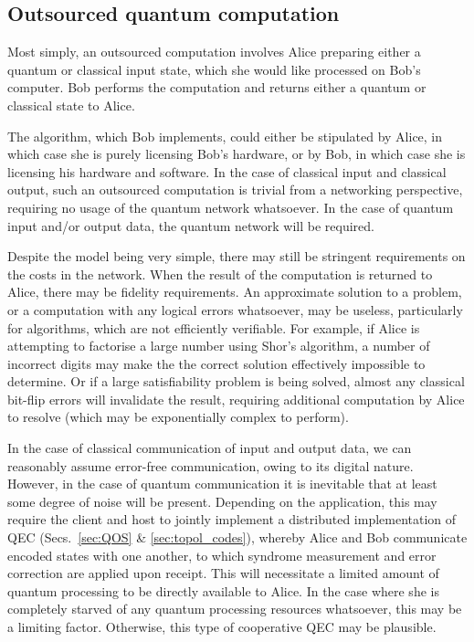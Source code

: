 \documentclass[aps,rmp,twocolumn,amsmath,amssymb,nofootinbib,superscriptaddress,longbibliography,floatfix,table-of-contents,eqsecnum]{revtex4-1}
\begin{document}
%
%

\subsection{Outsourced quantum computation} 

Most simply, an outsourced computation involves Alice preparing either a quantum or classical input state, which she would like processed on Bob's computer. Bob performs the computation and returns either a quantum or classical state to Alice.

The algorithm, which Bob implements, could either be stipulated by Alice, in which case she is purely licensing Bob's hardware, or by Bob, in which case she is licensing his hardware and software. In the case of classical input and classical output, such an outsourced computation is trivial from a networking perspective, requiring no usage of the quantum network whatsoever. In the case of quantum input and/or output data, the quantum network will be required.

Despite the model being very simple, there may still be stringent requirements on the costs in the network. When the result of the computation is returned to Alice, there may be fidelity requirements. An approximate solution to a problem, or a computation with any logical errors whatsoever, may be useless, particularly for algorithms, which are not efficiently verifiable. For example, if Alice is attempting to factorise a large number using Shor's algorithm, a number of incorrect digits may make the the correct solution effectively impossible to determine. Or if a large satisfiability problem is being solved, almost any classical bit-flip errors will invalidate the result, requiring additional computation by Alice to resolve (which may be exponentially complex to perform).

In the case of classical communication of input and output data, we can reasonably assume error-free communication, owing to its digital nature. However, in the case of quantum communication it is inevitable that at least some degree of noise will be present. Depending on the application, this may require the client and host to jointly implement a distributed implementation of QEC (Secs.~\ref{sec:QOS} \& \ref{sec:topol_codes}), whereby Alice and Bob communicate encoded states with one another, to which syndrome measurement and error correction are applied upon receipt. This will necessitate a limited amount of quantum processing to be directly available to Alice. In the case where she is completely starved of any quantum processing resources whatsoever, this may be a limiting factor. Otherwise, this type of cooperative QEC may be plausible.
\end{document}
